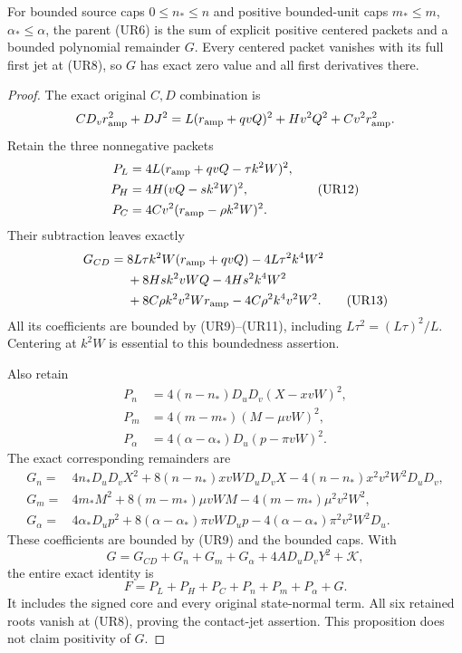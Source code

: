 \begin{proposition}
\label{prop:ui-bounded-remainder}
For bounded source caps $0\le n_*\le n$ and positive bounded-unit
caps $m_*\le m$, $\alpha_*\le\alpha$, the parent (UR6) is the sum
of explicit positive centered packets and a bounded polynomial
remainder $G$. Every centered packet vanishes with its full first jet
at (UR8), so $G$ has exact zero value and all first derivatives there.
\end{proposition}
\begin{proof}
The exact original $C,D$ combination is
\[
 CD_vr_{\rm amp}^2+DJ^2
   =L(r_{\rm amp}+qvQ)^2+Hv^2Q^2+Cv^2r_{\rm amp}^2.
\]
Retain the three nonnegative packets
\[
 \begin{aligned}
 P_L&=4L(r_{\rm amp}+qvQ-\tau k^2W)^2,\\
 P_H&=4H(vQ-sk^2W)^2,\\
 P_C&=4Cv^2(r_{\rm amp}-\rho k^2W)^2.
 \end{aligned}                                                   \tag{UR12}
\]
Their subtraction leaves exactly
\begin{align*}
 G_{CD}={}&8L\tau k^2W(r_{\rm amp}+qvQ)-4L\tau^2k^4W^2\\
 &+8Hs k^2vWQ-4Hs^2k^4W^2\\
 &+8C\rho k^2v^2Wr_{\rm amp}-4C\rho^2k^4v^2W^2.
 \tag{UR13}
\end{align*}
All its coefficients are bounded by (UR9)--(UR11), including
$L\tau^2=(L\tau)^2/L$. Centering at $k^2W$ is essential to this
boundedness assertion.

Also retain
\[
 \begin{aligned}
 P_n&=4(n-n_*)D_uD_v(X-xvW)^2,\\
 P_m&=4(m-m_*)(M-\mu vW)^2,\\
 P_\alpha&=4(\alpha-\alpha_*)D_u(p-\pi vW)^2.
 \end{aligned}                                                   \tag{UR14}
\]
The exact corresponding remainders are
\[
 \begin{aligned}
 G_n={}&4n_*D_uD_vX^2+8(n-n_*)xvWD_uD_vX
                    -4(n-n_*)x^2v^2W^2D_uD_v,\\
 G_m={}&4m_*M^2+8(m-m_*)\mu vWM
                    -4(m-m_*)\mu^2v^2W^2,\\
 G_\alpha={}&4\alpha_*D_up^2+8(\alpha-\alpha_*)\pi vWD_up
                    -4(\alpha-\alpha_*)\pi^2v^2W^2D_u.
 \end{aligned}                                                   \tag{UR15}
\]
These coefficients are bounded by (UR9) and the bounded caps. With
\[
 G=G_{CD}+G_n+G_m+G_\alpha+4AD_uD_vY^2+\mathcal K,
\]
the entire exact identity is
\[
 F=P_L+P_H+P_C+P_n+P_m+P_\alpha+G.                 \tag{UR16}
 \label{eq:ui-entire-reduction}
\]
It includes the signed core and every original state-normal term.
All six retained roots vanish at (UR8), proving the contact-jet
assertion. This proposition does not claim positivity of $G$.
\end{proof}

